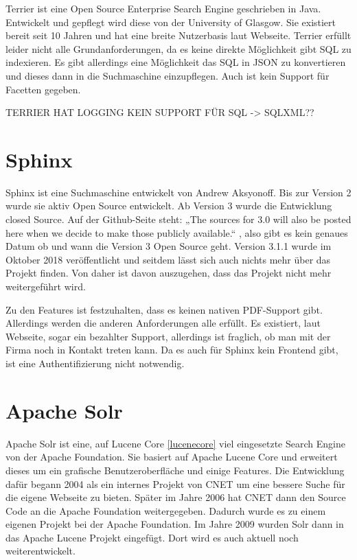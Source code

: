 Terrier ist eine Open Source Enterprise Search Engine geschrieben in Java. Entwickelt und gepflegt wird diese von der University of Glasgow. Sie existiert bereit seit 10 Jahren und hat eine breite Nutzerbasis laut Webseite. 
Terrier erfüllt leider nicht alle Grundanforderungen, da es keine direkte Möglichkeit gibt SQL zu indexieren. Es gibt allerdings eine Möglichkeit das SQL in JSON zu konvertieren und dieses dann in die Suchmaschine einzupflegen. Auch ist kein Support für Facetten gegeben.


\cite{McCreadie.2019}

TERRIER HAT LOGGING
KEIN SUPPORT FÜR SQL -> SQLXML??

\section{Sphinx}

Sphinx ist eine Suchmaschine entwickelt von Andrew Aksyonoff. Bis zur Version 2 wurde sie aktiv Open Source entwickelt. Ab Version 3 wurde die Entwicklung closed Source. Auf der Github-Seite steht: „The sources for 3.0 will also be posted here when we decide to make those publicly available.“ \cite{sphinxserach.2019}, also gibt es kein genaues Datum ob und wann die Version 3 Open Source geht. Version 3.1.1 wurde im Oktober 2018 veröffentlicht und seitdem lässt sich auch nichts mehr über das Projekt finden. Von daher ist davon auszugehen, dass das Projekt nicht mehr weitergeführt wird. 

Zu den Features ist festzuhalten, dass es keinen nativen PDF-Support gibt. Allerdings werden die anderen Anforderungen alle erfüllt. Es existiert, laut Webseite, sogar ein bezahlter Support, allerdings ist fraglich, ob man mit der Firma noch in Kontakt treten kann. Da es auch für Sphinx kein Frontend gibt, ist eine Authentifizierung nicht notwendig.
\cite{SphinxTechnologiesInc.2019}

\section{Apache Solr}

Apache Solr ist eine, auf Lucene Core \ref{lucenecore} viel eingesetzte Search Engine von der Apache Foundation. Sie basiert auf Apache Lucene Core und erweitert dieses um ein grafische Benutzeroberfläche und einige Features. 
Die Entwicklung dafür begann 2004 als ein internes Projekt von CNET um eine bessere Suche für die eigene Webseite zu bieten. Später im Jahre 2006 hat CNET dann den Source Code an die Apache Foundation weitergegeben. Dadurch wurde  es zu einem eigenen Projekt bei der Apache Foundation. Im Jahre 2009 wurden Solr dann in das Apache Lucene Projekt eingefügt. Dort wird es auch aktuell noch weiterentwickelt.
\cite{Wikipedia.2019b}

